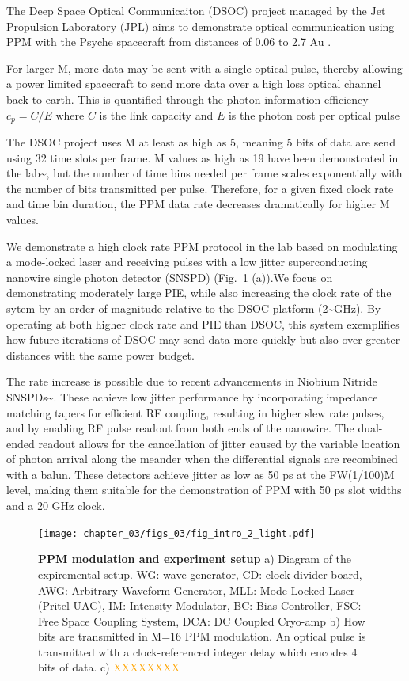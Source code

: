 \documentclass[11pt]{caltech_thesis} %
\begin{document}
The Deep Space Optical Communicaiton (DSOC) project managed by the Jet
Propulsion Laboratory (JPL) aims to demonstrate optical communication
using PPM with the Psyche spacecraft from distances of 0.06 to 2.7 Au
\autocite{Srinivasan2023GroundReceiver}.

For larger M, more data may be sent with a single optical pulse, thereby
allowing a power limited spacecraft to send more data over a high loss
optical channel back to earth. This is quantified through the photon
information efficiency $c_p = C/E$ where $C$ is the link capacity and
$E$ is the photon cost per optical pulse

The DSOC project uses M at least as high as 5, meaning 5 bits of data
are send using 32 time slots per frame. M values as high as 19 have been
demonstrated in the lab\textasciitilde{}\autocite{essiambre2023record},
but the number of time bins needed per frame scales exponentially with
the number of bits transmitted per pulse. Therefore, for a given fixed
clock rate and time bin duration, the PPM data rate decreases
dramatically for higher M values.

We demonstrate a high clock rate PPM protocol in the lab based on
modulating a mode-locked laser and receiving pulses with a low jitter
superconducting nanowire single photon detector (SNSPD)
(Fig.~\ref{fig:intro} (a)).We focus on demonstrating moderately large
PIE, while also increasing the clock rate of the sytem by an order of
magnitude relative to the DSOC platform (2\textasciitilde GHz). By
operating at both higher clock rate and PIE than DSOC, this system
exemplifies how future iterations of DSOC may send data more quickly but
also over greater distances with the same power budget.

The rate increase is possible due to recent advancements in Niobium
Nitride SNSPDs\textasciitilde{}\autocite{Colangelo2023}. These achieve
low jitter performance by incorporating impedance matching tapers for
efficient RF coupling, resulting in higher slew rate pulses, and by
enabling RF pulse readout from both ends of the nanowire. The dual-ended
readout allows for the cancellation of jitter caused by the variable
location of photon arrival along the meander when the differential
signals are recombined with a balun. These detectors achieve jitter as
low as 50 ps at the FW(1/100)M level, making them suitable for the
demonstration of PPM with 50 ps slot widths and a 20 GHz clock.

\hypertarget{fig:intro}{%
\begin{figure}
\centering
\texttt{[image: chapter\_03/figs\_03/fig\_intro\_2\_light.pdf]}
\caption[{PPM modulation and experiment setup}]{\textbf{PPM modulation
and experiment setup} a) Diagram of the expiremental setup. WG: wave
generator, CD: clock divider board, AWG: Arbitrary Waveform Generator,
MLL: Mode Locked Laser (Pritel UAC), IM: Intensity Modulator, BC: Bias
Controller, FSC: Free Space Coupling System, DCA: DC Coupled Cryo-amp b)
How bits are transmitted in M=16 PPM modulation. An optical pulse is
transmitted with a clock-referenced integer delay which encodes 4 bits
of data. c) \textcolor{orange}{XXXXXXXX}}
\label{fig:intro}
\end{figure}
}
\end{document}
